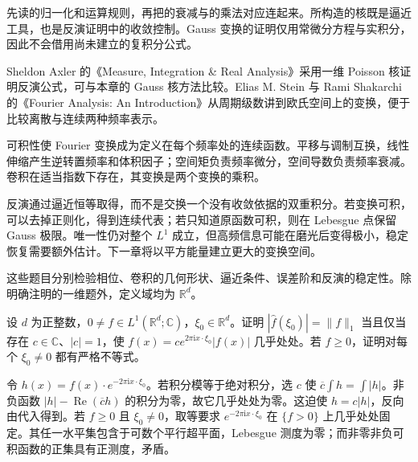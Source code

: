 先读的归一化和运算规则，再把的衰减与的乘法对应连起来。所构造的核既是逼近工具，也是反演证明中的收敛控制。Gauss 变换的证明仅用常微分方程与实积分，因此不会借用尚未建立的复积分公式。

\ProseParagraphBreak

Sheldon Axler 的《Measure, Integration \& Real Analysis》\cite[Section 11C]{Axler2020Measure}采用一维 Poisson 核证明反演公式，可与本章的 Gauss 核方法比较。Elias M. Stein 与 Rami Shakarchi 的《Fourier Analysis: An Introduction》\cite{Stein2003Fourier}从周期级数讲到欧氏空间上的变换，便于比较离散与连续两种频率表示。







\begin{chaptersummary}
可积性使 Fourier 变换成为定义在每个频率处的连续函数。平移与调制互换，线性伸缩产生逆转置频率和体积因子；空间矩负责频率微分，空间导数负责频率衰减。卷积在适当指数下存在，其变换是两个变换的乘积。

\ProseParagraphBreak

反演通过逼近恒等取得，而不是交换一个没有收敛依据的双重积分。若变换可积，可以去掉正则化，得到连续代表；若只知道原函数可积，则在 Lebesgue 点保留 Gauss 极限。唯一性仍对整个 \(L^1\) 成立，但高频信息可能在磨光后变得极小，稳定恢复需要额外估计。下一章将以平方能量建立更大的变换空间。
\end{chaptersummary}

\BookExercises

这些题目分别检验相位、卷积的几何形状、逼近条件、误差阶和反演的稳定性。除明确注明的一维题外，定义域均为 \(\mathbb R^d\)。

\begin{exercise}\label{b2:ex:03-phase-equality}
设 \(d\) 为正整数，\(0\ne f\in L^1(\mathbb R^d;\mathbb C)\)，\(\xi_0\in\mathbb R^d\)。证明 \(|\widehat f(\xi_0)|=\|f\|_1\) 当且仅当存在 \(c\in\mathbb C\)、\(|c|=1\)，使 \(f(x)=c e^{2\pi\mathrm{i}x\cdot\xi_0}|f(x)|\) 几乎处处。若 \(f\geq0\)，证明对每个 \(\xi_0\ne0\) 都有严格不等式。
\end{exercise}
\begin{solution}
令 \(h(x)=f(x)\cdot e^{-2\pi\mathrm{i}x\cdot\xi_0}\)。若积分模等于绝对积分，选 \(c\) 使 \(\overline c\int h=\int|h|\)。非负函数 \(|h|-\operatorname{Re}(\overline ch)\) 的积分为零，故它几乎处处为零。这迫使 \(h=c|h|\)，反向由代入得到。若 \(f\geq0\) 且 \(\xi_0\ne0\)，取等要求 \(e^{-2\pi\mathrm{i}x\cdot\xi_0}\) 在 \(\{f>0\}\) 上几乎处处固定。其任一水平集包含于可数个平行超平面，Lebesgue 测度为零；而非零非负可积函数的正集具有正测度，矛盾。
\end{solution}

